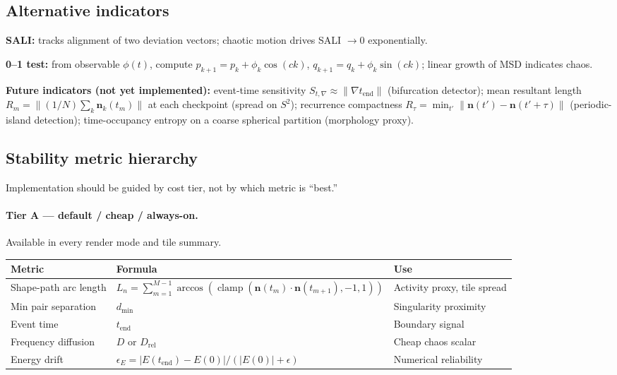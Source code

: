 \documentclass[11pt]{report}
\DeclareMathOperator{\clamp}{clamp}
\begin{document}
\subsection{Alternative indicators}

\textbf{SALI:} tracks alignment of two deviation vectors; chaotic motion drives SALI $\to 0$ exponentially.

\textbf{0--1 test:} from observable $\phi(t)$, compute $p_{k+1}=p_k+\phi_k\cos(ck)$, $q_{k+1}=q_k+\phi_k\sin(ck)$; linear growth of MSD indicates chaos.

\textbf{Future indicators (not yet implemented):} event-time sensitivity $S_{t,\nabla}\approx\|\nabla t_{\mathrm{end}}\|$ (bifurcation detector); mean resultant length $R_m=\|(1/N)\sum_k\mathbf n_k(t_m)\|$ at each checkpoint (spread on $S^2$); recurrence compactness $R_\tau=\min_{t'}\|\mathbf n(t')-\mathbf n(t'+\tau)\|$ (periodic-island detection); time-occupancy entropy on a coarse spherical partition (morphology proxy).

\subsection{Stability metric hierarchy}
\label{sec:metric_hierarchy}

Implementation should be guided by cost tier, not by which metric is ``best.''

\paragraph{Tier A --- default / cheap / always-on.}
Available in every render mode and tile summary.
\begin{center}
\begin{tabular}{lll}
\toprule
Metric & Formula & Use \\
\midrule
Shape-path arc length & $L_n=\sum_{m=1}^{M-1}\arccos(\clamp(\mathbf n(t_m)\cdot\mathbf n(t_{m+1}),-1,1))$ & Activity proxy, tile spread \\
Min pair separation & $d_{\min}$ & Singularity proximity \\
Event time & $t_{\mathrm{end}}$ & Boundary signal \\
Frequency diffusion & $D$ or $D_{\mathrm{rel}}$ & Cheap chaos scalar \\
Energy drift & $\epsilon_E=|E(t_{\mathrm{end}})-E(0)|/(|E(0)|+\epsilon)$ & Numerical reliability \\
\bottomrule
\end{tabular}
\end{center}
\end{document}
